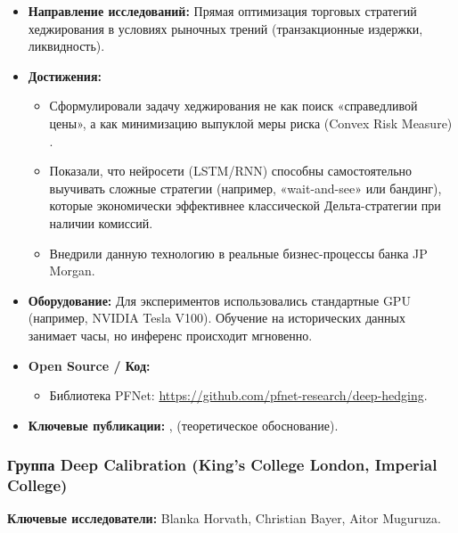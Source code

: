 \begin{itemize}
    \item \textbf{Направление исследований:} Прямая оптимизация торговых стратегий хеджирования в условиях рыночных трений (транзакционные издержки, ликвидность).
    \item \textbf{Достижения:}
    \begin{itemize}
        \item Сформулировали задачу хеджирования не как поиск «справедливой цены», а как минимизацию выпуклой меры риска (Convex Risk Measure) \cite{Buehler2019}.
        \item Показали, что нейросети (LSTM/RNN) способны самостоятельно выучивать сложные стратегии (например, «wait-and-see» или бандинг), которые экономически эффективнее классической Дельта-стратегии при наличии комиссий.
        \item Внедрили данную технологию в реальные бизнес-процессы банка JP Morgan.
    \end{itemize}
    \item \textbf{Оборудование:} Для экспериментов использовались стандартные GPU (например, NVIDIA Tesla V100). Обучение на исторических данных занимает часы, но инференс происходит мгновенно.
    \item \textbf{Open Source / Код:}
    \begin{itemize}
        \item Библиотека PFNet: \url{https://github.com/pfnet-research/deep-hedging}.
    \end{itemize}
    \item \textbf{Ключевые публикации:} \cite{Buehler2019}, \cite{Cuchiero2021} (теоретическое обоснование).
\end{itemize}

\subsubsection{Группа Deep Calibration (King's College London, Imperial College)}
\textbf{Ключевые исследователи:} Blanka Horvath, Christian Bayer, Aitor Muguruza.

